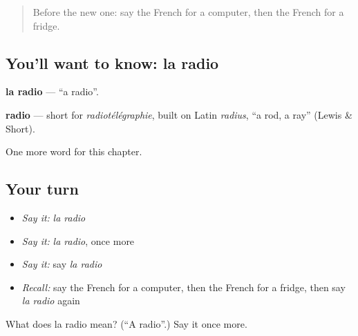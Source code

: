 \label{lesson:FR-C111-radio}



\begin{quote}
Before the new one: say the French for a computer, then the French for a fridge.
\end{quote}

\subsection*{You'll want to know: la radio}
\textbf{la radio} — \textquotedblleft{}a radio\textquotedblright{}.

\begin{cousinweb}
\textbf{radio} — short for \emph{radiotélégraphie}, built on Latin \emph{radius}, \textquotedblleft{}a rod, a ray\textquotedblright{} (Lewis \& Short).
\end{cousinweb}

\begin{grammarlens}[title={What you've built}]
One more word for this chapter.
\end{grammarlens}

\subsection*{Your turn}
\begin{itemize}
\raggedright
  \item \emph{Say it:} \emph{la radio}
  \item \emph{Say it:} \emph{la radio}, once more
  \item \emph{Say it:} say \emph{la radio}
  \item \emph{Recall:} say the French for a computer, then the French for a fridge, then say \emph{la radio} again
\end{itemize}

\begin{tcolorbox}[breakable,colback=teal!4,colframe=teal!35!black,title={Before you move on}]
What does la radio mean? (\textquotedblleft{}A radio\textquotedblright{}.) Say it once more.
\end{tcolorbox}

